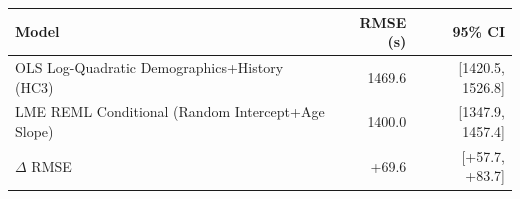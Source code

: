 \begin{tabular}{lrr}
\hline
Model & RMSE (s) & 95\% CI \\
\hline
OLS Log-Quadratic Demographics+History (HC3) & 1469.6 & [1420.5, 1526.8] \\
LME REML Conditional (Random Intercept+Age Slope) & 1400.0 & [1347.9, 1457.4] \\
\hline
$\Delta$ RMSE & +69.6 & [+57.7, +83.7] \\
\hline
\end{tabular}
